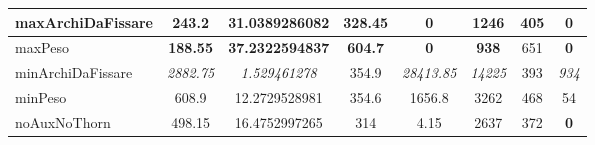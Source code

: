\begin{table}
\begin{tabular}{l|c|c|c|c|c|c|c}
\rowcolor[HTML]{EFEFEF} 
maxArchiDaFissare   & 243.2                & 31.0389286082                                                    & 328.45                                                                      & \textbf{0}                                                                 & 1246                                                                 & 405                                                                     & \textbf{0}                                                             \\ \hline
maxPeso             & \textbf{188.55}      & \textbf{37.2322594837}                                           & \textbf{604.7}                                                              & \textbf{0}                                                                 & \textbf{938}                                                       & 651                                                                     & \textbf{0}                                                             \\ \hline
\rowcolor[HTML]{EFEFEF} 
minArchiDaFissare   & \textit{2882.75}     & \textit{1.529461278}                                             & 354.9                                                                       & \textit{28413.85}                                                          & \textit{14225}                                               & 393                                                                     & \textit{934}                                                           \\ \hline
minPeso             & 608.9                & 12.2729528981                                                    & 354.6                                                                       & 1656.8                                                                     & 3262                                                                 & 468                                                                     & 54                                                                     \\ \hline
\rowcolor[HTML]{EFEFEF} 
noAuxNoThorn        & 498.15               & 16.4752997265                                                    & 314                                                                         & 4.15                                                                       & 2637                                                                 & 372                                                                     & \textbf{0}                                                             \\ \hline

\end{tabular}
\end{table}
